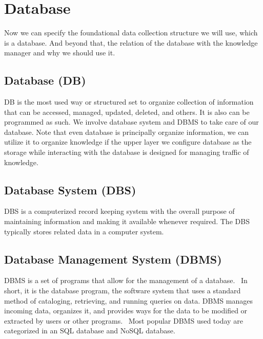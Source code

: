 \section{Database}
\label{sec:database}

Now we can specify the foundational data collection structure we will use, which is a database. And beyond that, the relation of the database with the knowledge manager and why we should use it.

\subsection{Database (DB)}
\label{ssec:database}

\ac{DB} is the most used way or structured set to organize collection of information that can be accessed, managed, updated, deleted, and others.
It is also can be programmed as such.
We involve database system and \ac{DBMS} to take care of our database.
Note that even database is principally organize information, we can utilize it to organize knowledge if the upper layer we configure database as the storage while interacting with the database is designed for managing traffic of knowledge.

\subsection{Database System (DBS)}
\label{ssec:database-system}

\ac{DBS} is a computerized record keeping system with the overall purpose of maintaining information and making it available whenever required.
The \ac{DBS} typically stores related data in a computer system.~\autocite{Foster2014Intro}

\subsection{Database Management System (DBMS)}
\label{ssec:dbms}

\ac{DBMS} is a set of programs that allow for the
management of a database.~\autocite{Foster2014Intro}
In short, it is the database program, the software system that uses a standard method of cataloging, retrieving, and running queries on data. \ac{DBMS} manages incoming data, organizes it, and provides ways for the data to be modified or extracted by users or other programs.~\autocite{TechTerms:2014:DBMS}
Most popular \ac{DBMS} used today are categorized in an \ac{SQL} database and \ac{NoSQL} database.

